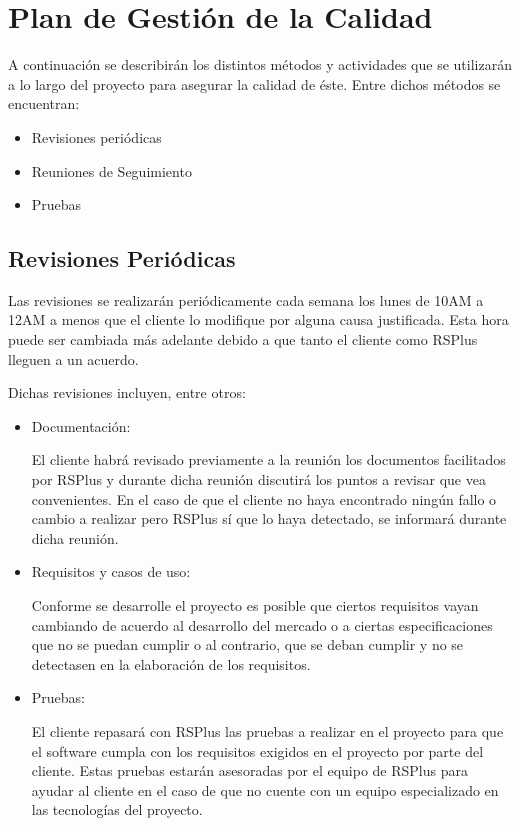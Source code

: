 \section{Plan de Gestión de la Calidad}

\par A continuación se describirán los distintos métodos y actividades que se utilizarán a lo largo del proyecto para asegurar la calidad de éste. Entre dichos métodos se encuentran:
\begin{itemize}[-]
  \item Revisiones periódicas
  \item Reuniones de Seguimiento
  \item Pruebas
\end{itemize}

\subsection{Revisiones Periódicas}
\par Las revisiones se realizarán periódicamente cada semana los lunes de 10AM a 12AM a menos que el cliente lo modifique por alguna causa justificada. Esta hora puede ser cambiada más adelante debido a que tanto el cliente como RSPlus lleguen a un acuerdo.
\par Dichas revisiones incluyen, entre otros:
 \begin{itemize}[-]
  \item Documentación: \par El cliente habrá revisado previamente a la reunión los documentos facilitados por RSPlus y durante dicha reunión discutirá los puntos a revisar que vea convenientes. En el caso de que el cliente no haya encontrado ningún fallo o cambio a realizar pero RSPlus sí que lo haya detectado, se informará durante dicha reunión.
  \item Requisitos y casos de uso: \par Conforme se desarrolle el proyecto es posible que ciertos requisitos vayan cambiando de acuerdo al desarrollo del mercado o a ciertas especificaciones que no se puedan cumplir o al contrario, que se deban cumplir y no se detectasen en la elaboración de los requisitos.
  \item Pruebas: \par El cliente repasará con RSPlus las pruebas a realizar en el proyecto para que el software cumpla con los requisitos exigidos en el proyecto por parte del cliente. Estas pruebas estarán asesoradas por el equipo de RSPlus para ayudar al cliente en el caso de que no cuente con un equipo especializado en las tecnologías del proyecto.
\end{itemize}

